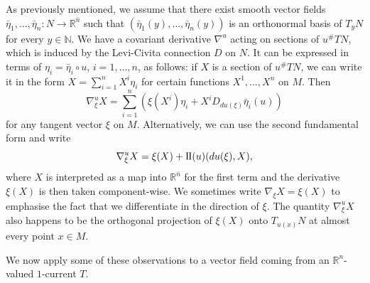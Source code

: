 \documentclass[a4paper]{article}
\newcommand{\R}{\mathbb{R}}
\newcommand{\N}{\mathbb{N}}
\newcommand{\ndim}{{\bar{n}}}
\newcommand{\sff}{\mathrm{I{\mkern -1mu}I}}
\theoremstyle{definition}
\theoremstyle{remark}
\begin{document}
As previously mentioned, we assume that there exist smooth vector fields
$\bar{\eta}_1, \dotsc, \bar{\eta}_n \colon N \to \R^{\bar{n}}$ such that $(\bar{\eta}_1(y), \dotsc, \bar{\eta}_n(y))$ is an
orthonormal basis of $T_y N$ for every $y \in \N$.
We have a covariant derivative $\nabla^u$ acting on sections of $u^\# TN$,
which is induced by the Levi-Civita connection $D$ on $N$.
It can be expressed in terms of $\eta_i = \bar{\eta}_i \circ u$, $i = 1, \dotsc, n$, as follows: if $X$ is a section of $u^\# TN$, we can write it in the form $X = \sum_{i = 1}^n X^i \eta_i$ for certain functions $X^1, \dotsc, X^n$ on $M$.
Then
\[
\nabla_\xi^u X = \sum_{i = 1}^n \left(\xi(X^i) \eta_i + X^i D_{du(\xi)} \bar{\eta}_i(u)\right)
\]
for any tangent vector $\xi$ on $M$.
Alternatively, we can use the second fundamental form and write
\[
\nabla_\xi^u X = \xi(X) + \sff(u)(du(\xi), X),
\]
where $X$ is interpreted as a map into $\R^\ndim$ for the first term and the derivative $\xi(X)$ is then taken component-wise. We sometimes write
$\nabla_\xi X = \xi(X)$ to emphasise the fact that we differentiate in the direction
of $\xi$. The quantity $\nabla_\xi^u X$ also happens to be
the orthogonal projection of $\xi(X)$ onto $T_{u(x)} N$ at almost every point $x \in M$.

We now apply some of these observations to a vector field coming from
an $\R^n$-valued $1$-current $T$.
\end{document}
